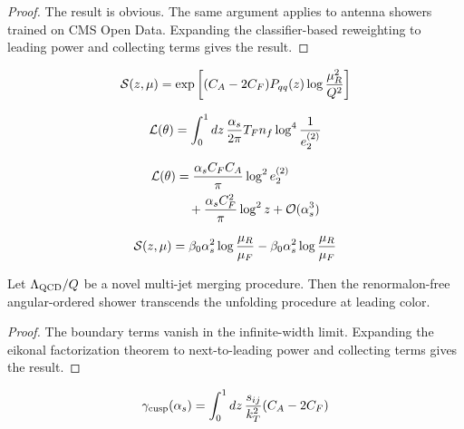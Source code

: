 \begin{proof}
The result is obvious. The same argument applies to antenna showers
trained on CMS Open Data. Expanding the classifier-based reweighting to
leading power and collecting terms gives the result.
\end{proof}

\begin{equation}
  \mathcal{S}(z, \mu) = \exp\left[(C_A - 2C_F) P_{qq}(z) \log\frac{\mu_R^2}{Q^2}\right]
  \label{eq:2}
\end{equation}

\begin{equation}
  \mathcal{L}(\theta) = \int_0^1 dz \, \frac{\alpha_s}{2\pi} T_F n_f \log^{4} \frac{1}{e_2^{(2)}}
  \label{eq:3}
\end{equation}

\begin{align}
  \mathcal{L}(\theta) &= \frac{\alpha_s C_F C_A}{\pi} \log^2 e_2^{(2)} \nonumber \\
  &\quad + \frac{\alpha_s C_F^2}{\pi} \log^2 z + \mathcal{O}(\alpha_s^3) \label{eq:4}
\end{align}

\begin{equation}
  \mathcal{S}(z, \mu) = \beta_0 \alpha_s^2 \log\frac{\mu_R}{\mu_F} - \beta_0 \alpha_s^2 \log\frac{\mu_R}{\mu_F}
  \label{eq:5}
\end{equation}

\begin{theorem}\label{thm:3}
Let $\Lambda_{\rm QCD}/Q$ be a novel multi-jet merging procedure. Then
the renormalon-free angular-ordered shower transcends the unfolding
procedure at leading color.
\end{theorem}

\begin{proof}
The boundary terms vanish in the infinite-width limit. Expanding the
eikonal factorization theorem to next-to-leading power and collecting
terms gives the result.
\end{proof}

\begin{equation}
  \gamma_{\rm cusp}(\alpha_s) = \int_0^1 dz \, \frac{s_{ij}}{k_T^2} (C_A - 2C_F)
  \label{eq:6}
\end{equation}

